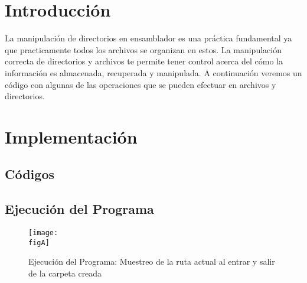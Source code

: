     \restoregeometry %

    \clearpage
    \tableofcontents

    \clearpage
    \listoffigures


    \clearpage
    \lstlistoflistings

    \clearpage
    \vspace*{6pt}
	\centerline{\textbf{\huge \theTitle}}
    \vspace*{8pt}

	\section{Introducción}

	La manipulación de directorios en ensamblador es una práctica fundamental ya que practicamente todos los archivos se organizan en estos. La manipulación
	correcta de directorios y archivos te permite tener control acerca del cómo la información es
	almacenada, recuperada y manipulada. A continuación veremos un código con algunas de las operaciones que se pueden efectuar en archivos y directorios.

	\clearpage
	\section{Implementación}

	\subsection{Códigos}

	

	

	\clearpage
	\subsection{Ejecución del Programa}

	\begin{figure}[h]
		\centering
		\texttt{[image: \\figA]}
		\caption{Ejecución del Programa: Muestreo de la ruta actual al entrar y salir de la carpeta creada}
	\end{figure}

